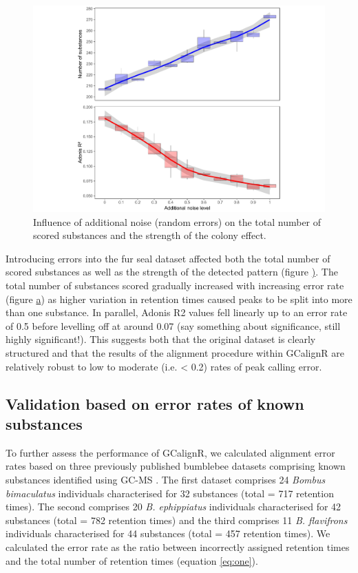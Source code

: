\begin{figure}[htbp]
\centering
\includegraphics[width=13cm]{figures/adonis}
\caption{Influence of additional noise (random errors) on the total number of scored substances and the strength of the colony effect.}
\label{figure:adonis}
\end{figure}

Introducing errors into the fur seal dataset affected both the total
number of scored substances as well as the strength of the detected
pattern (figure \href{figure:adonis}). The total number of substances
scored gradually increased with increasing error rate (figure
\href{figure:adonis} a) as higher variation in retention times caused
peaks to be split into more than one substance. In parallel, Adonis R2
values fell linearly up to an error rate of 0.5 before levelling off at
around 0.07 (say something about significance, still highly
significant!). This suggests both that the original dataset is clearly
structured and that the results of the alignment procedure within
GCalignR are relatively robust to low to moderate (i.e. \textless{} 0.2)
rates of peak calling error.

\subsection{Validation based on error rates of known
substances}\label{validation-based-on-error-rates-of-known-substances}

To further assess the performance of GCalignR, we calculated alignment
error rates based on three previously published bumblebee datasets
comprising known substances identified using GC-MS
\citep{Dellicour.2013}. The first dataset comprises 24 \emph{Bombus
bimaculatus} individuals characterised for 32 substances (total = 717
retention times). The second comprises 20 \emph{B. ephippiatus}
individuals characterised for 42 substances (total = 782 retention
times) and the third comprises 11 \emph{B. flavifrons} individuals
characterised for 44 substances (total = 457 retention times). We
calculated the error rate as the ratio between incorrectly assigned
retention times and the total number of retention times (equation
\eqref{eq:one}).

